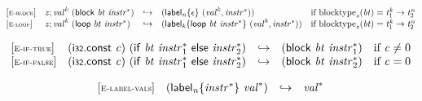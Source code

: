 $$
\begin{array}{@{}l@{}lcl@{}l@{}}
{[\textsc{\scriptsize E{-}block}]} \quad & {\mathit{z}} ; {{\mathit{val}}^{{\mathit{k}}}}~(\mathsf{block}~{\mathit{bt}}~{{\mathit{instr}}^\ast}) &\hookrightarrow& ({{\mathsf{label}}_{{\mathit{n}}}}{\{\epsilon\}}~({{\mathit{val}}^{{\mathit{k}}}}, {{\mathit{instr}}^\ast})) &\quad
  \mbox{if}~{{\mathrm{blocktype}}}_{{\mathit{z}}}({\mathit{bt}}) = {{\mathit{t}}_{{1}}^{{\mathit{k}}}} \rightarrow {{\mathit{t}}_{{2}}^{{\mathit{n}}}} \\
{[\textsc{\scriptsize E{-}loop}]} \quad & {\mathit{z}} ; {{\mathit{val}}^{{\mathit{k}}}}~(\mathsf{loop}~{\mathit{bt}}~{{\mathit{instr}}^\ast}) &\hookrightarrow& ({{\mathsf{label}}_{{\mathit{k}}}}{\{\mathsf{loop}~{\mathit{bt}}~{{\mathit{instr}}^\ast}\}}~({{\mathit{val}}^{{\mathit{k}}}}, {{\mathit{instr}}^\ast})) &\quad
  \mbox{if}~{{\mathrm{blocktype}}}_{{\mathit{z}}}({\mathit{bt}}) = {{\mathit{t}}_{{1}}^{{\mathit{k}}}} \rightarrow {{\mathit{t}}_{{2}}^{{\mathit{n}}}} \\
\end{array}
$$

$$
\begin{array}{@{}l@{}lcl@{}l@{}}
{[\textsc{\scriptsize E{-}if{-}true}]} \quad & (\mathsf{i{\scriptstyle32}}.\mathsf{const}~{\mathit{c}})~(\mathsf{if}~{\mathit{bt}}~{{\mathit{instr}}_{{1}}^\ast}~\mathsf{else}~{{\mathit{instr}}_{{2}}^\ast}) &\hookrightarrow& (\mathsf{block}~{\mathit{bt}}~{{\mathit{instr}}_{{1}}^\ast}) &\quad
  \mbox{if}~{\mathit{c}} \neq 0 \\
{[\textsc{\scriptsize E{-}if{-}false}]} \quad & (\mathsf{i{\scriptstyle32}}.\mathsf{const}~{\mathit{c}})~(\mathsf{if}~{\mathit{bt}}~{{\mathit{instr}}_{{1}}^\ast}~\mathsf{else}~{{\mathit{instr}}_{{2}}^\ast}) &\hookrightarrow& (\mathsf{block}~{\mathit{bt}}~{{\mathit{instr}}_{{2}}^\ast}) &\quad
  \mbox{if}~{\mathit{c}} = 0 \\
\end{array}
$$

\vspace{1ex}

$$
\begin{array}{@{}l@{}lcl@{}l@{}}
{[\textsc{\scriptsize E{-}label{-}vals}]} \quad & ({{\mathsf{label}}_{{\mathit{n}}}}{\{{{\mathit{instr}}^\ast}\}}~{{\mathit{val}}^\ast}) &\hookrightarrow& {{\mathit{val}}^\ast} &  \\
\end{array}
$$

\vspace{1ex}

